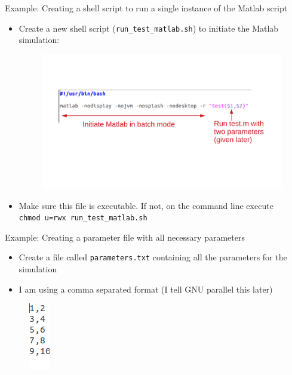 \documentclass{beamer}
\begin{document}
\begin{frame}{Example: Creating a shell script to run a single instance of the Matlab script}
\begin{itemize}
	\item Create a new shell script (\texttt{run\_test\_matlab.sh}) to initiate the Matlab simulation:
\begin{figure}
\includegraphics[clip,trim=0in 2in 0in 2in,width=0.8\linewidth]{figures/run_matlab_sh_annotated.pdf}
\end{figure}
\item Make sure this file is executable. If not, on the command line execute \\ \texttt{chmod u=rwx run\_test\_matlab.sh}
\end{itemize}
\end{frame}

\begin{frame}{Example: Creating a parameter file with all necessary parameters}
\begin{itemize}
	\item Create a file called \texttt{parameters.txt} containing all the parameters for the simulation
	\item I am using a comma separated format (I tell GNU parallel this later)
\end{itemize}
\begin{figure}
\includegraphics[width=.05\linewidth]{figures/parameter_file.png}
\end{figure}
\end{frame}
\end{document}
